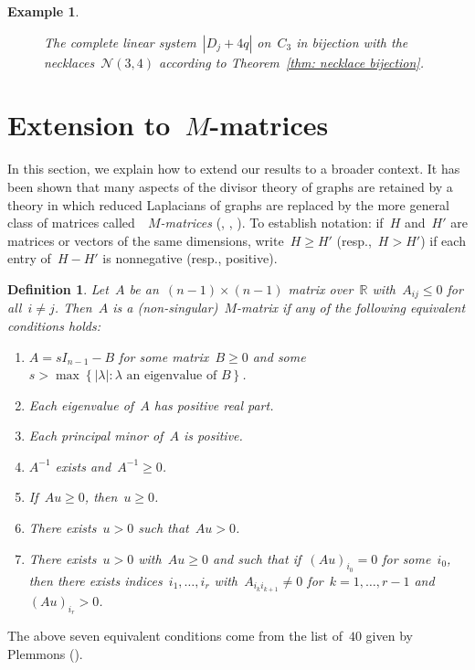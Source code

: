 \documentclass{amsart}
\newtheorem{Definition}[thm]{Definition}
\newenvironment{defn}
  {\begin{Definition}\rm}{\end{Definition}}
\newtheorem{Example}[thm]{Example}
\newenvironment{example}
  {\begin{Example}\rm}{\end{Example}}
\newcommand{\R}{\mathbb{R}}
\newcommand{\neck}{\mathcal{N}}
\begin{document}
\begin{example}
\begin{figure}[ht!]
\begin{center}
  \end{center}
  \caption{The complete linear system~$|D_j+4q|$ on~$C_3$ 
  in bijection with the necklaces~$\neck(3,4)$ according to Theorem~\ref{thm:
necklace bijection}.}\label{fig: C_3 necklaces} 
\end{figure} 
\end{example}

\section{Extension to~$M$-matrices}\label{sect: m-matrices}  In this section,
we explain how to extend our results to a broader context.  It has been shown that
many aspects of the divisor theory of graphs are retained by a theory in which
reduced Laplacians of graphs are replaced by the more general class of matrices
called~{\em ~$M$-matrices} (\cite{Gabrielov}, \cite{Guzman}, \cite{Postnikov}).
To establish notation: if~$H$ and~$H'$ are matrices or vectors of the same
dimensions, write~$H\geq H'$ (resp.,~$H>H'$) if each entry of~$H-H'$ is
nonnegative (resp., positive).
\begin{defn}  Let~$A$ be an~$(n-1)\times(n-1)$ matrix over~$\R$ with~$A_{ij}\leq
  0$ for all~$i\neq j$.  Then~$A$ is a (non-singular)~{\em $M$-matrix} if any of
  the following equivalent conditions holds:
  \begin{enumerate}
    \item $A=sI_{n-1}-B$ for some matrix~$B\geq0$ and some 
      $s>\max\left\{ |\lambda|:\text{$\lambda$ an eigenvalue of~$B$}\right\}$.
    \item Each eigenvalue of~$A$ has positive real part.
    \item Each principal minor of~$A$ is positive.
    \item $A^{-1}$ exists and~$A^{-1}\geq0$.
    \item If~$Au\geq0$, then~$u\geq0$.
    \item There exists~$u>0$ such that~$Au>0$.
    \item\label{item: burning} There exists~$u>0$ with~$Au\geq0$ and such that
      if~$(Au)_{i_0}=0$ for some~$i_0$, 
      then there exists indices~$i_1,\dots,i_r$ with~$A_{i_{k}i_{k+1}}\neq0$
      for~$k=1,\dots,r-1$ and~$(Au)_{i_r}>0$.
  \end{enumerate}
\end{defn}
The above seven equivalent conditions come from the list of~$40$ given
by Plemmons (\cite{Plemmons}).  
\end{document}
